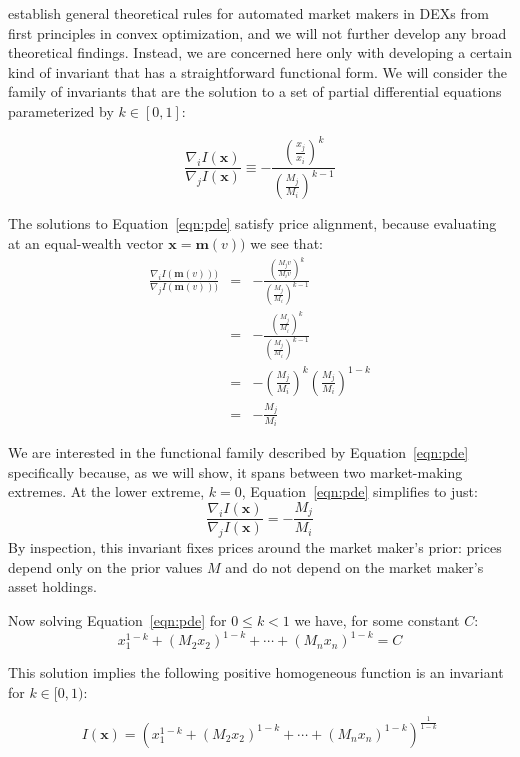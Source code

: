 \documentclass[11pt]{article}
\newcommand{\grad}{\nabla} %
\renewcommand{\vec}[1]{\mathbf{ #1 }}
\begin{document}
\citet{angeris2020improved} establish general theoretical rules for automated market makers in DEXs from first principles in convex optimization, and we will not further develop any broad theoretical findings. Instead, we are concerned here only with developing a certain kind of invariant that has a straightforward functional form. We will consider the family of invariants that are the solution to a set of partial differential equations parameterized by $k \in [0,1]$:

\begin{equation}
\frac{\grad_i I(\vec{x}) }{\grad_j I(\vec{x})} \equiv -\frac{\left(\frac{x_j}{x_i}\right)^k}{\left(\frac{M_j}{M_i}\right)^{k-1}}
\label{eqn:pde}
\end{equation}

The solutions to Equation~\ref{eqn:pde} satisfy price alignment, because evaluating at  an equal-wealth vector $\vec{x} = \vec{m}(v))$ we see that:
\begin{eqnarray*}
\frac{\grad_i I(\vec{m}(v))) }{\grad_j I(\vec{m}(v)))}&  =&  - \frac{  \left(\frac{M_jv}{M_iv} \right)^k  }{ \left(\frac{M_j}{M_i} \right)^{k-1}  } \\
& = & -\frac{ \left( \frac{M_j}{M_i} \right)^k }{ \left( \frac{M_j}{M_i} \right)^{k-1}}\\
& = & -\left(\frac{M_j}{M_i}\right)^k \left(\frac{M_j}{M_i} \right)^{1-k}\\
& = & - \frac{M_j}{M_i}
\end{eqnarray*}

We are interested in the functional family described by Equation~\ref{eqn:pde} specifically because, as we will show, it spans between two market-making extremes. At the lower extreme, $k=0$, Equation~\ref{eqn:pde} simplifies to just:
\[ \frac{\grad_i I(\vec{x}) }{\grad_j I(\vec{x})} = -\frac{M_j}{M_i} \]
By inspection, this invariant fixes prices around the market maker's prior: prices depend only on the prior values $M$ and do not depend on the market maker's asset holdings.

Now solving Equation~\ref{eqn:pde} for $0 \leq k < 1$ we have, for some constant $C$:
\[ x_1^{1-k} + (M_2x_2)^{1-k} + \cdots + (M_n x_n)^{1-k} = C \]

This solution implies the following positive homogeneous function is an invariant for $k \in [0, 1)$:

\begin{equation}
I(\vec{x}) = \left( x_1^{1-k} + (M_2x_2)^{1-k} + \cdots + (M_n x_n)^{1-k} \right)^{\frac{1}{1-k}}
\label{eqn:sol}
\end{equation}
\end{document}
